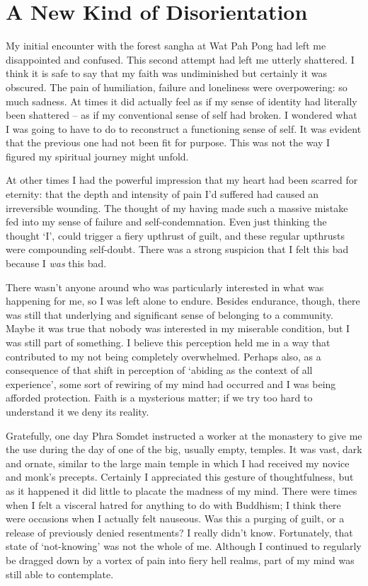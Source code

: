 \chapter{A New Kind of Disorientation}

My initial encounter with the forest sangha at Wat Pah Pong had left me
disappointed and confused. This second attempt had left me utterly
shattered. I think it is safe to say that my faith was undiminished but
certainly it was obscured. The pain of humiliation, failure and
loneliness were overpowering: so much sadness. At times it did actually
feel as if my sense of identity had literally been shattered -- as if my
conventional sense of self had broken. I wondered what I was going to
have to do to reconstruct a functioning sense of self. It was evident
that the previous one had not been fit for purpose. This was not the way
I figured my spiritual journey might unfold.

At other times I had the powerful impression that my heart had been
scarred for eternity: that the depth and intensity of pain I'd suffered
had caused an irreversible wounding. The thought of my having made such
a massive mistake fed into my sense of failure and self-condemnation.
Even just thinking the thought `I', could trigger a fiery upthrust of
guilt, and these regular upthrusts were compounding self-doubt. There
was a strong suspicion that I felt this bad because I \emph{was} this
bad.

There wasn't anyone around who was particularly interested in what was
happening for me, so I was left alone to endure. Besides endurance,
though, there was still that underlying and significant sense of
belonging to a community. Maybe it was true that nobody was interested
in my miserable condition, but I was still part of something. I believe
this perception held me in a way that contributed to my not being
completely overwhelmed. Perhaps also, as a consequence of that shift in
perception of `abiding as the context of all experience', some sort of
rewiring of my mind had occurred and I was being afforded protection.
Faith is a mysterious matter; if we try too hard to understand it we
deny its reality.

Gratefully, one day Phra Somdet instructed a worker at the monastery to
give me the use during the day of one of the big, usually empty,
temples. It was vast, dark and ornate, similar to the large main temple
in which I had received my novice and monk's precepts. Certainly I
appreciated this gesture of thoughtfulness, but as it happened it did
little to placate the madness of my mind. There were times when I felt a
visceral hatred for anything to do with Buddhism; I think there were
occasions when I actually felt nauseous. Was this a purging of guilt, or
a release of previously denied resentments? I really didn't know.
Fortunately, that state of `not-knowing' was not the whole of me.
Although I continued to regularly be dragged down by a vortex of pain
into fiery hell realms, part of my mind was still able to contemplate.

